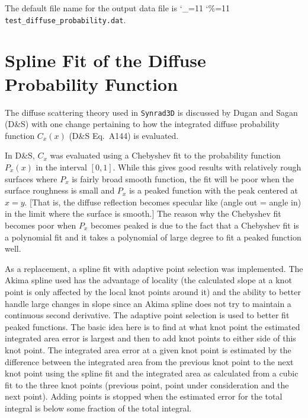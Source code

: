 \documentclass[11pt,openany]{report}
\newcommand{\srthree}{\texttt{Synrad3D}\xspace}
\newcommand\ttcmd{\begingroup\catcode`\_=11 \catcode`\%=11 \dottcmd}
\newcommand\dottcmd[1]{\texttt{#1}\endgroup}
\newcommand{\vn}{\ttcmd}
\begin{document}
{{{The default file name for the output data file is \vn{test_diffuse_probability.dat}.


\appendix
\chapter{Spline Fit of the Diffuse Probability Function}
\label{c:spline}

The diffuse scattering theory used in \srthree is discussed by Dugan and Sagan\cite{b:prab} (D\&S)
with one change pertaining to how the integrated diffuse probability function $C_x(x)$ (D\&S
Eq.~A144) is evaluated. 

In D\&S, $C_x$ was evaluated using a Chebyshev fit to the probability function $P_x(x)$ in the
interval $[0,1]$. While this gives good results with relatively rough surfaces where $P_x$ is fairly
broad smooth function, the fit will be poor when the surface roughness is small and $P_x$ is a
peaked function with the peak centered at $x = y$. [That is, the diffuse reflection becomes specular
like (angle out = angle in) in the limit where the surface is smooth.] The reason why the Chebyshev
fit becomes poor when $P_x$ becomes peaked is due to the fact that a Chebyshev fit is a polynomial
fit and it takes a polynomial of large degree to fit a peaked function well.

As a replacement, a spline fit with adaptive point selection was implemented. The Akima spline
used\cite{b:akima} has the advantage of locality (the calculated slope at a knot point is only
affected by the local knot points around it) and the ability to better handle large changes in slope
since an Akima spline does not try to maintain a continuous second derivative. The adaptive point
selection is used to better fit peaked functions. The basic idea here is to find at what knot point
the estimated integrated area error is largest and then to add knot points to either side of this
knot point. The integrated area error at a given knot point is estimated by the difference between
the integrated area from the previous knot point to the next knot point using the spline fit and the
integrated area as calculated from a cubic fit to the three knot points (previous point, point under
consideration and the next point). Adding points is stopped when the estimated error for the total
integral is below some fraction of the total integral.

}}}
\end{document}
